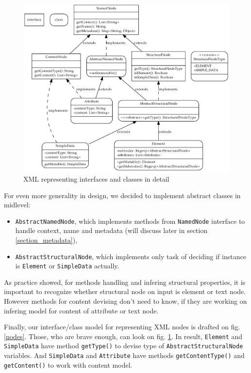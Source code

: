 \documentclass[a4paper,10pt,oneside]{article}
\newcommand{\myscale}{0.74}
\newcommand{\code}[1]{\texttt{#1}}
\begin{document}
\begin{figure}
\centering\includegraphics[scale=\myscale]{nodes_full}
\caption{XML representing interfaces and classes in detail} \label{nodes_full}
\end{figure}

For even more generality in design, we decided to implement abstract classes in midlevel:
\begin{itemize}
	\item \code{AbstractNamedNode}, which implements methods from \code{NamedNode} interface to handle context, name and metadata (will discuss later in section \ref{section_metadata}),
	\item \code{AbstractStructuralNode}, which implements only task of deciding if instance is \code{Element} or \code{SimpleData} actually.
\end{itemize}
As practice showed, for methods handling and infering structural properties, it is important to recognize whether structural node on input is element or text node.
However methods for content devising don't need to know, if they are working on infering model for content of attribute or text node.

Finally, our interface/class model for representing XML nodes is drafted on fig. \ref{nodes}. Those, who are brave enough, can look on fig. \ref{nodes_full}.
In result, \code{Element} and \code{SimpleData} have method \code{getType()} to devise type of \code{AbstractStructuralNode} variables. And \code{SimpleData} and \code{Attribute} have methods \code{getContentType()} and \code{getContent()} to work with content model.
\end{document}
